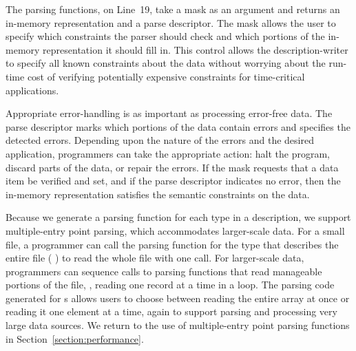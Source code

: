 The parsing functions, \eg{}  on Line~19, take a mask as an argument and returns an
in-memory representation and a parse descriptor.  
The mask allows the user to specify 
which constraints the parser should check and which portions of the
in-memory representation it should fill in.  This control allows the
description-writer to specify all known constraints about the data
without worrying about the run-time cost of verifying potentially
expensive constraints for time-critical applications.

Appropriate error-handling is as important as processing error-free
data.  The parse descriptor marks which portions of the data contain
errors and specifies the detected errors.  Depending upon the nature
of the errors and the desired application, programmers can take the
appropriate action: halt the program, discard parts of the data, or
repair the errors.  If the mask requests that a data item be verified
and set, and if the parse descriptor indicates no error, then the
in-memory representation satisfies the semantic constraints on the
data.

Because we generate a parsing function for each type in a \pads{}
description, we support multiple-entry point parsing, which
accommodates larger-scale data.  For a small file, a programmer can
call the parsing function for the \pads{} type that describes the
entire file (\eg{} ) to read the whole file with
one call.  For larger-scale data, programmers can sequence calls to
parsing functions that read manageable portions of the file, \eg{},
reading one record at a time in a loop.  The parsing code generated for
s allows users to choose between reading the entire array
at once or reading it one element at a time, again to support parsing
and processing very large data sources.  We return to the use of
multiple-entry point parsing functions in
Section~\ref{section:performance}.

